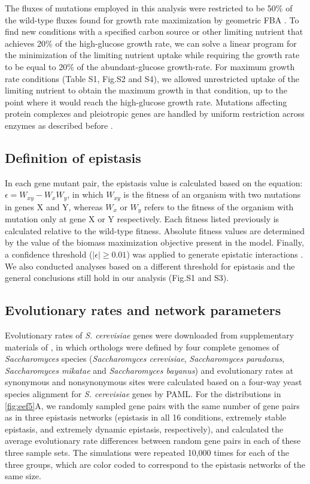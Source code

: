 \documentclass[10pt]{article}
\newcommand{\Figs}{Fig.} %
\newcommand{\citep}{\cite}
\newcommand{\citet}{\citep}
\begin{document}
The fluxes of mutations employed in this analysis were restricted to
be 50\% of the wild-type fluxes found for growth rate maximization by
geometric FBA \citep{He2010}. To find new conditions with a specified carbon
source or other limiting nutrient that achieves 20\% of the
high-glucose growth rate, we can solve a linear program for the
minimization of the limiting nutrient uptake while requiring the
growth rate to be equal to 20\% of the abundant-glucose
growth-rate. For maximum growth rate conditions (Table S1, \Figs\:S2
and S4), we allowed unrestricted uptake of the limiting nutrient to
obtain the maximum growth in that condition, up to the point where it
would reach the high-glucose growth rate. Mutations affecting protein
complexes and pleiotropic genes are handled by uniform restriction
across enzymes as described before \citep{Xu2012}.

\subsection*{Definition of epistasis}

In each gene mutant pair, the epistasis value is calculated based on
the equation: $\epsilon = W_{xy} - W_xW_y$, in which $W_{xy}$ is the
fitness of an organism with two mutations in genes X and Y, whereas
$W_{x}$ or $W_{y}$ refers to the fitness of the organism with mutation
only at gene X or Y respectively. Each fitness listed previously is
calculated relative to the wild-type fitness. Absolute fitness values
are determined by the value of the biomass maximization objective
present in the model. Finally, a confidence threshold
($\left|\epsilon\right| \geq 0.01$) was applied to generate epistatic
interactions \citep{Xu2012, Costanzo2010, He2010}. We also conducted
analyses based on a different threshold for epistasis and the general
conclusions still hold in our analysis (\Figs\:S1 and S3).

\subsection*{Evolutionary rates and network parameters}

Evolutionary rates of \textit{S. cerevisiae} genes were downloaded
from supplementary materials of \citet{Wall2005}, in which orthologs were
defined by four complete genomes of \textit{Saccharomyces} species
(\textit{Saccharomyces cerevisiae}, \textit{Saccharomyces paradoxus},
\textit{Saccharomyces mikatae} and \textit{Saccharomyces bayanus}) and
evolutionary rates at synonymous and nonsynonymous sites were
calculated based on a four-way yeast species alignment for
\textit{S. cerevisiae} genes by PAML. For the distributions in
\ref{fig:eef5}A, we randomly sampled gene pairs with the same number
of gene pairs
as in three epistasis networks (epistasis in all 16 conditions,
extremely stable epistasis, and extremely dynamic epistasis,
respectively), and calculated the average evolutionary rate
differences between random gene pairs in each of these three sample
sets. The simulations were repeated 10,000 times for each of the three
groups, which are color coded to correspond to the epistasis networks
of the same size.
\end{document}
